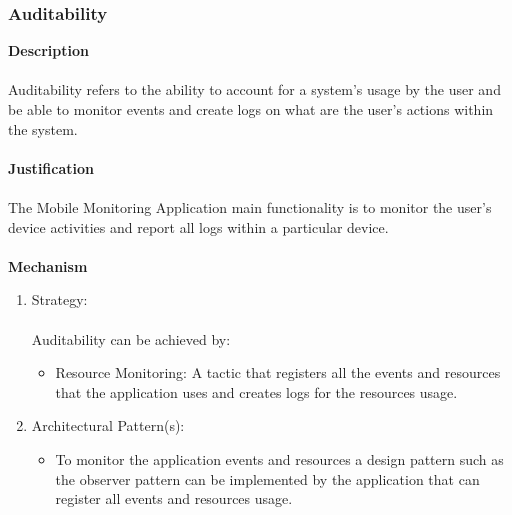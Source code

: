\documentclass[hidelinks, 12pt, oneside]{article}
\begin{document}
			\subsubsection{Auditability}
			\textbf{Description} \\\\
			Auditability refers to the ability to account for a system's usage by the user and be able to monitor events and create logs on what are the user's actions within the system.\\\\
			\textbf{Justification}\\\\
			The Mobile Monitoring Application main functionality is to monitor the user's device activities and report all logs within a particular device.\\\\
			\textbf{Mechanism}
				\begin{enumerate}
					\item Strategy: \\\\
						Auditability can be achieved by:
						\begin{itemize}
							\item Resource Monitoring: A tactic that registers all the events and resources that the application uses and creates logs for the resources usage.  
						\end{itemize}
					\item Architectural Pattern(s):
						\begin{itemize}
							\item To monitor the application events and resources a design pattern such as the observer pattern can be implemented by the application that can register all events and resources usage. 
						\end{itemize}
				\end{enumerate}	
			\newpage
\end{document}
